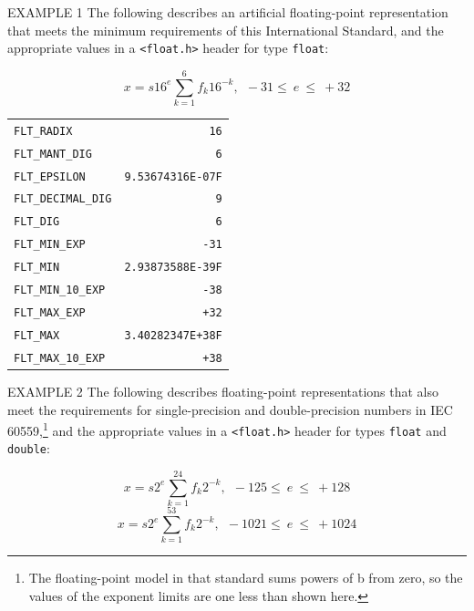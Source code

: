 \small{EXAMPLE 1 The following describes an artificial floating-point
  representation that meets the minimum requirements of this International
  Standard, and the appropriate values in a \texttt{<float.h>} header for type
  \texttt{float}:}

$$x = s16^e\sum_{k=1}^6f_k16^{-k}, ~~ -31\le~e~\le~+32$$

\small{\hspace*{2cm}\begin{tabular}{lr}
\texttt{FLT\_RADIX}&\hfil\hspace*{3cm}\texttt{16}\\
\texttt{FLT\_MANT\_DIG}&\hfil\hspace*{3cm}\texttt{6}\\
\texttt{FLT\_EPSILON}&\hfil\hspace*{3cm}\texttt{9.53674316E-07F}\\
\texttt{FLT\_DECIMAL\_DIG}&\hfil\hspace*{3cm}\texttt{9}\\
\texttt{FLT\_DIG}&\hfil\hspace*{3cm}\texttt{6}\\
\texttt{FLT\_MIN\_EXP}&\hfil\hspace*{3cm}\texttt{-31}\\
\texttt{FLT\_MIN}&\hfil\hspace*{3cm}\texttt{2.93873588E-39F}\\
\texttt{FLT\_MIN\_10\_EXP}&\hfil\hspace*{3cm}\texttt{-38}\\
\texttt{FLT\_MAX\_EXP}&\hfil\hspace*{3cm}\texttt{+32}\\
\texttt{FLT\_MAX}&\hfil\hspace*{3cm}\texttt{3.40282347E+38F}\\
\texttt{FLT\_MAX\_10\_EXP}&\hfil\hspace*{3cm}\texttt{+38}
\end{tabular}

EXAMPLE 2 The following describes floating-point representations that also meet
the requirements for single-precision and double-precision numbers in IEC
60559,\footnote{The floating-point model in that standard sums powers of b from
  zero, so the values of the exponent limits are one less than shown here.} and
the appropriate values in a \texttt{<float.h>} header for types \texttt{float}
and \texttt{double}:

$$x = s2^e\sum_{k=1}^{24}f_k2^{-k}, ~~ -125\le~e~\le~+128$$
$$x = s2^e\sum_{k=1}^{53}f_k2^{-k}, ~~ -1021\le~e~\le~+1024$$

}
